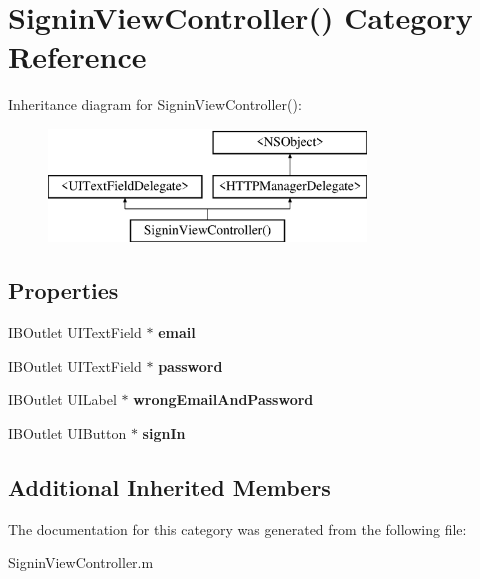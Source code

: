 \hypertarget{category_signin_view_controller_07_08}{\section{Signin\+View\+Controller() Category Reference}
\label{category_signin_view_controller_07_08}
}
Inheritance diagram for Signin\+View\+Controller()\+:\begin{figure}[H]
\begin{center}
\leavevmode
\includegraphics[height=3.000000cm]{category_signin_view_controller_07_08}
\end{center}
\end{figure}
\subsection*{Properties}
\begin{DoxyCompactItemize}
\item 
\hypertarget{category_signin_view_controller_07_08_ae5b554e96559f2a82812b35fd9887504}{I\+B\+Outlet U\+I\+Text\+Field $\ast$ {\bfseries email}}\label{category_signin_view_controller_07_08_ae5b554e96559f2a82812b35fd9887504}

\item 
\hypertarget{category_signin_view_controller_07_08_a7afa5b92d29448b889bb3c8296e3cbe0}{I\+B\+Outlet U\+I\+Text\+Field $\ast$ {\bfseries password}}\label{category_signin_view_controller_07_08_a7afa5b92d29448b889bb3c8296e3cbe0}

\item 
\hypertarget{category_signin_view_controller_07_08_ae2144fd28fdba90eb581a7f893b364dc}{I\+B\+Outlet U\+I\+Label $\ast$ {\bfseries wrong\+Email\+And\+Password}}\label{category_signin_view_controller_07_08_ae2144fd28fdba90eb581a7f893b364dc}

\item 
\hypertarget{category_signin_view_controller_07_08_aced39124899a7dab60f2c8c562ba266c}{I\+B\+Outlet U\+I\+Button $\ast$ {\bfseries sign\+In}}\label{category_signin_view_controller_07_08_aced39124899a7dab60f2c8c562ba266c}

\end{DoxyCompactItemize}
\subsection*{Additional Inherited Members}


The documentation for this category was generated from the following file\+:\begin{DoxyCompactItemize}
\item 
Signin\+View\+Controller.\+m\end{DoxyCompactItemize}
